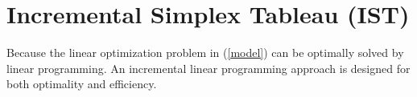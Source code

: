 \documentclass[letterpaper]{article}
\begin{document}
%

\section{Incremental  Simplex Tableau (IST)}

Because the linear optimization problem in (\ref{model})  can be optimally solved by linear programming. An incremental linear programming approach is designed for both optimality and efficiency.
\end{document}
